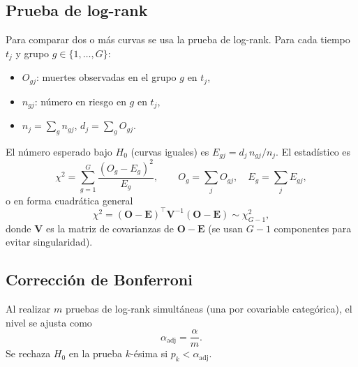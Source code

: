 \documentclass[12pt]{article}
\begin{document}
\subsection{Prueba de log-rank}
Para comparar dos o más curvas se usa la prueba de log-rank. Para cada tiempo $t_j$ y grupo $g \in \{1, \dots, G\}$:
\begin{itemize}
\item $O_{gj}$: muertes observadas en el grupo $g$ en $t_j$,
\item $n_{gj}$: número en riesgo en $g$ en $t_j$,
\item $n_j = \sum_g n_{gj}$, $d_j = \sum_g O_{gj}$.
\end{itemize}
El número esperado bajo $H_0$ (curvas iguales) es $E_{gj} = d_j \, n_{gj}/n_j$. El estadístico es
\begin{equation}
\chi^2 = \sum_{g=1}^{G} \frac{(O_g - E_g)^2}{E_g},
\qquad O_g = \sum_j O_{gj},\quad E_g = \sum_j E_{gj},
\end{equation}
o en forma cuadrática general
\begin{equation}
\chi^2 = (\mathbf{O} - \mathbf{E})^\top \mathbf{V}^{-1} (\mathbf{O} - \mathbf{E}) \sim \chi^2_{G-1},
\end{equation}
donde $\mathbf{V}$ es la matriz de covarianzas de $\mathbf{O} - \mathbf{E}$ (se usan $G-1$ componentes para evitar singularidad).

\subsection{Corrección de Bonferroni}
Al realizar $m$ pruebas de log-rank simultáneas (una por covariable categórica), el nivel se ajusta como
\begin{equation}
\alpha_{\text{adj}} = \frac{\alpha}{m}.
\end{equation}
Se rechaza $H_0$ en la prueba $k$-ésima si $p_k < \alpha_{\text{adj}}$.
\end{document}
